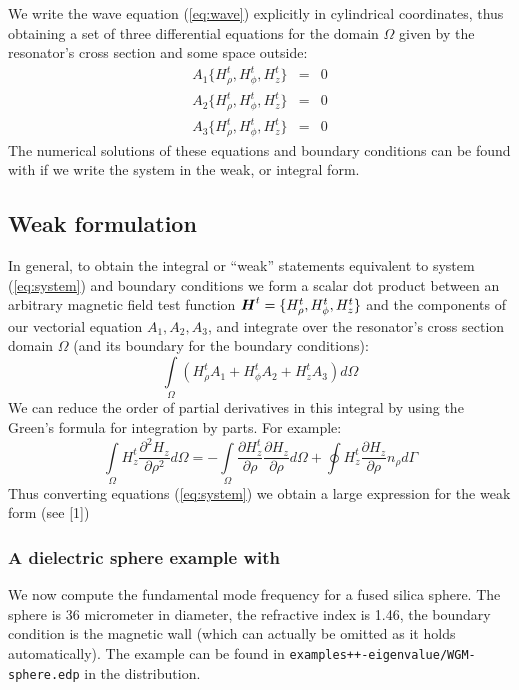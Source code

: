 \documentclass[a4paper,twoside,12pt]{book}
\def\vec#1{\mbox{\boldmath $#1$}}
\begin{document}
We write the wave equation (\ref{eq:wave}) explicitly in cylindrical coordinates, thus obtaining a set of three differential equations for the domain $\Omega$ given by the resonator's cross section and some space outside:
\begin{eqnarray}\label{eq:system}
A_1\{{H}_{\rho}^t,{H}_{\phi}^t,{H}_{z}^t\}&=&0\\ \nonumber
A_2\{{H}_{\rho}^t,{H}_{\phi}^t,{H}_{z}^t\}&=&0\\ \nonumber
A_3\{{H}_{\rho}^t,{H}_{\phi}^t,{H}_{z}^t\}&=&0
\end{eqnarray}
 The numerical solutions of these equations and boundary conditions can be found with \freefempp if we write the system in the weak, or integral form.
\subsection{Weak formulation}
In general, to obtain the integral or ``weak'' statements equivalent to system (\ref{eq:system}) and boundary conditions we form a scalar dot product between an arbitrary magnetic field test function $\vec{H}^t=\{{H}_{\rho}^t,{H}_{\phi}^t,{H}_{z}^t\}$ and the components of our vectorial equation $A_1,A_2,A_3$, and integrate over the resonator's cross section domain $\Omega$ (and its boundary for the boundary conditions):
\begin{equation}\label{eq:weak-initial}
\int\limits_{\Omega}(H^t_{\rho}A_1+H^t_{\phi}A_2+H^t_{z}A_3)d\Omega
\end{equation}
We can reduce the order of partial derivatives in this integral by using the Green's formula for integration by parts. For example:
\begin{equation}\label{eq:example}
\int\limits_{\Omega}H_z^t \frac{\partial^2 H_z}{\partial \rho^2 }d\Omega=
-\int\limits_{\Omega}\frac{\partial H_z^t}{\partial \rho}\frac{\partial H_z}{\partial \rho }d\Omega+\oint H_z^t\frac{\partial H_z}{\partial \rho}n_{\rho}d\Gamma
\end{equation}
Thus converting equations (\ref{eq:system}) we obtain a large expression for the weak form (see [1])

\subsubsection{A dielectric sphere example with \freefempp}
We now compute the fundamental mode frequency for a fused silica sphere. The sphere is 36 micrometer in diameter, the refractive index is 1.46, the boundary condition is the magnetic wall (which can actually be omitted as it holds automatically). The example can be found in \texttt{examples++-eigenvalue/WGM-sphere.edp} in the distribution.
\end{document}
